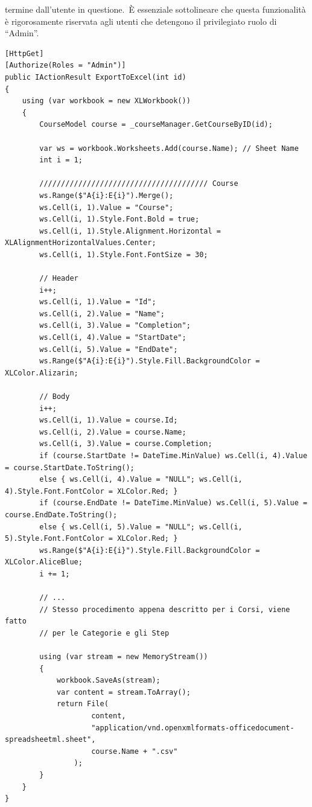 termine dall'utente in questione.\ È essenziale sottolineare che questa funzionalità è rigorosamente riservata agli 
utenti che detengono il privilegiato ruolo di ``Admin''.
%
\begin{lstlisting}[style=cs_style, caption=esempio funzione per l'esecuzione di una query da codice tramite il framework Dapper]
[HttpGet]
[Authorize(Roles = "Admin")]
public IActionResult ExportToExcel(int id)
{
	using (var workbook = new XLWorkbook())
	{
		CourseModel course = _courseManager.GetCourseByID(id);

		var ws = workbook.Worksheets.Add(course.Name); // Sheet Name
		int i = 1;

		/////////////////////////////////////// Course
		ws.Range($"A{i}:E{i}").Merge();
		ws.Cell(i, 1).Value = "Course";
		ws.Cell(i, 1).Style.Font.Bold = true;
		ws.Cell(i, 1).Style.Alignment.Horizontal = XLAlignmentHorizontalValues.Center;
		ws.Cell(i, 1).Style.Font.FontSize = 30;

		// Header
		i++;
		ws.Cell(i, 1).Value = "Id";
		ws.Cell(i, 2).Value = "Name";
		ws.Cell(i, 3).Value = "Completion";
		ws.Cell(i, 4).Value = "StartDate";
		ws.Cell(i, 5).Value = "EndDate";
		ws.Range($"A{i}:E{i}").Style.Fill.BackgroundColor = XLColor.Alizarin;

		// Body
		i++;
		ws.Cell(i, 1).Value = course.Id;
		ws.Cell(i, 2).Value = course.Name;
		ws.Cell(i, 3).Value = course.Completion;
		if (course.StartDate != DateTime.MinValue) ws.Cell(i, 4).Value = course.StartDate.ToString();
		else { ws.Cell(i, 4).Value = "NULL"; ws.Cell(i, 4).Style.Font.FontColor = XLColor.Red; }
		if (course.EndDate != DateTime.MinValue) ws.Cell(i, 5).Value = course.EndDate.ToString();
		else { ws.Cell(i, 5).Value = "NULL"; ws.Cell(i, 5).Style.Font.FontColor = XLColor.Red; }
		ws.Range($"A{i}:E{i}").Style.Fill.BackgroundColor = XLColor.AliceBlue;
		i += 1;

		// ...
		// Stesso procedimento appena descritto per i Corsi, viene fatto
		// per le Categorie e gli Step 
		
		using (var stream = new MemoryStream())
		{
			workbook.SaveAs(stream);
			var content = stream.ToArray();
			return File(
					content,
					"application/vnd.openxmlformats-officedocument-spreadsheetml.sheet",
					course.Name + ".csv"
				);
		}
	}
}
\end{lstlisting}

